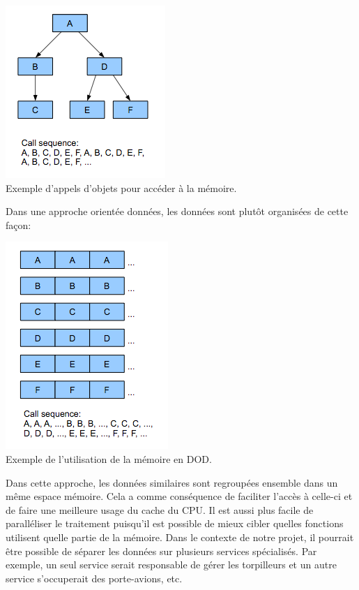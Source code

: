 \documentclass[12pt]{article}
\begin{document}
\begin{center}
\includegraphics[scale = 0.75]{1_qfwHVxcEq7XQjASYCClQpg.png} \\
Exemple d'appels d'objets pour accéder à la mémoire.\cite{data_oriented_design}
\\[1.0 cm]
\end{center}

Dans une approche orientée données, les données sont plutôt organisées de cette façon:

\begin{center}
\includegraphics[scale = 0.75]{1_T4XqlgosIzMA_WLzlKWyEw.png} \\
Exemple de l'utilisation de la mémoire en DOD.\cite{data_oriented_design}
\\[1.0 cm]
\end{center}

Dans cette approche, les données similaires sont regroupées ensemble dans un même espace mémoire. Cela a comme conséquence de faciliter l'accès à celle-ci et de faire une meilleure usage du cache du CPU. Il est aussi plus facile de paralléliser le traitement puisqu'il est possible de mieux cibler quelles fonctions utilisent quelle partie de la mémoire. Dans le contexte de notre projet, il pourrait être possible de séparer les données sur plusieurs services spécialisés. Par exemple, un seul service serait responsable de gérer les torpilleurs et un autre service s'occuperait des porte-avions, etc.
\end{document}
